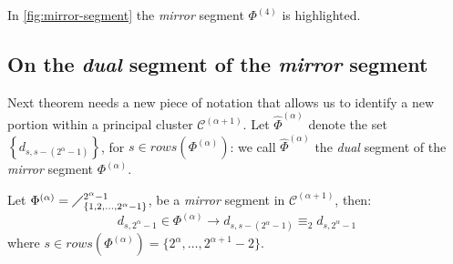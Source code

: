 
In \autoref{fig:mirror-segment} the \emph{mirror} segment $\Phi^{(4)}$ is highlighted.

\subsection{On the \emph{dual} segment of the \emph{mirror} segment}

Next theorem needs a new piece of notation that allows us to identify a 
new portion within a principal cluster $\mathcal{C}^{(\alpha+1)}$.
Let $\hat{\Phi}^{(\alpha)}$ denote the set $\left\lbrace d_{s,s-(2^{\alpha}-1)}\right\rbrace$,
for $s\in rows\left(\Phi^{(\alpha)}\right)$: we call $\hat{\Phi}^{(\alpha)}$  
the \emph{dual} segment of the \emph{mirror} segment $\Phi^{(\alpha)}$.

\begin{theorem}
    Let  $\Phi^{(\alpha)}=\diagup_{\lbrace 1,2,\ldots,2^{\alpha}-1\rbrace}^{2^{\alpha}-1}$, 
    be a \emph{mirror} segment in $\mathcal{C}^{(\alpha+1)}$, then: 
    \begin{equation}
        d_{s,2^{\alpha}-1}\in\Phi^{(\alpha)}\rightarrow d_{s,s-(2^{\alpha}-1)}\equiv_{2}d_{s,2^{\alpha}-1}
    \end{equation}
    where $s\in rows\left(\Phi^{(\alpha)}\right)=\lbrace2^{\alpha},\ldots,2^{\alpha+1}-2\rbrace$.
\end{theorem}

